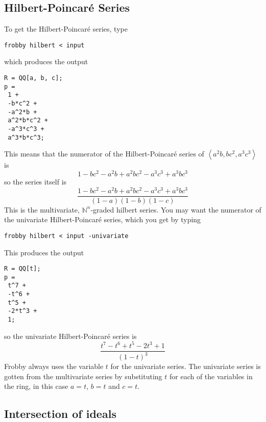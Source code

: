 \documentclass{amsart}
\theoremstyle{definition}
\newcommand{\hp}{Hilbert-Poincar\'e}
\newcommand{\hps}{Hilbert-Poincar\'e series}
\newcommand{\N}{\mathbb{N}}
\newcommand{\ideal}[1]{\left<#1\right>}
\begin{document}
\subsection{\hp{} Series}

To get the \hps{}, type
\begin{verbatim}
frobby hilbert < input
\end{verbatim}
which produces the output
\begin{verbatim}
R = QQ[a, b, c];
p =
 1 +
 -b*c^2 +
 -a^2*b +
 a^2*b*c^2 +
 -a^3*c^3 +
 a^3*b*c^3;
\end{verbatim}
This means that the numerator of the \hps{} of $\ideal{a^2b,bc^2,a^3c^3}$ is
\[
 1
 -bc^2
 -a^2b +
 a^2bc^2
 -a^3c^3 +
 a^3bc^3
\]
so the series itself is
\[
\frac{
 1
 -bc^2
 -a^2b +
 a^2bc^2
 -a^3c^3 +
 a^3bc^3
}{
(1-a)(1-b)(1-c)}
\]
This is the multivariate, $\N^n$-graded hilbert series. You may want
the numerator of the univariate \hps{}, which you get by typing
\begin{verbatim}
frobby hilbert < input -univariate
\end{verbatim}
This produces the output
\begin{verbatim}
R = QQ[t];
p =
 t^7 +
 -t^6 +
 t^5 +
 -2*t^3 +
 1;
\end{verbatim}
so the univariate \hps{} is
\[
\frac{
 t^7
 -t^6 +
 t^5
 -2t^3 +
 1}{(1-t)^3}
\]
Frobby always uses the variable $t$ for the univariate series. The
univariate series is gotten from the multivariate series by
substituting $t$ for each of the variables in the ring, in this case
$a=t$, $b=t$ and $c=t$.

\subsection{Intersection of ideals}
\end{document}
